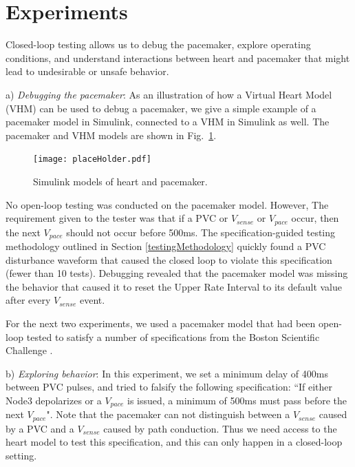 \section{Experiments}
\label{experiments}

Closed-loop testing allows us to debug the pacemaker, explore operating conditions, and understand interactions between heart and pacemaker that might lead to undesirable or unsafe behavior.

a) \emph{Debugging the pacemaker}: As an illustration of how a Virtual Heart Model (VHM) can be used to debug a pacemaker, we give a simple example of a pacemaker model in Simulink, connected to a VHM in Simulink as well. 
The pacemaker and VHM models are shown in Fig.~\ref{fig:simulinkModels}.
\begin{figure}[tb]
	\centering
	\texttt{[image: placeHolder.pdf]}
	\caption{Simulink models of heart and pacemaker.}
	\label{fig:simulinkModels}
\end{figure}
No open-loop testing was conducted on the pacemaker model.
However, 
The requirement given to the tester was that if a PVC or $V_{sense}$ or $V_{pace}$ occur, then the next $V_{pace}$ should not occur before 500ms. 
The specification-guided testing methodology outlined in Section \ref{testingMethodology} quickly found a PVC disturbance waveform that caused the closed loop to violate this specification (fewer than 10 tests).
Debugging revealed that the pacemaker model was missing the behavior that caused it to reset the Upper Rate Interval to its default value after every $V_{sense}$ event.

For the next two experiments, we used a pacemaker model that had been open-loop tested to satisfy a number of specifications from the Boston Scientific Challenge \cite{challenge}.

b) \emph{Exploring behavior}: In this experiment, we set a minimum delay of 400ms between PVC pulses, and tried to falsify the following specification:
``If either Node3 depolarizes or a $V_{pace}$ is issued, a minimum of 500ms must pass before the next $V_{pace}$".
Note that the pacemaker can not distinguish between a $V_{sense}$ caused by a PVC and a $V_{sense}$ caused by path conduction.
Thus we need access to the heart model to test this specification, and this can only happen in a closed-loop setting.

